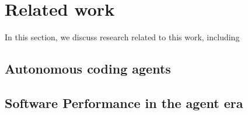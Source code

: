 \section{Related work}
\label{related}
In this section, we discuss research related to this work, including 

\subsection{Autonomous coding agents}


\subsection{Software Performance in the agent era}
